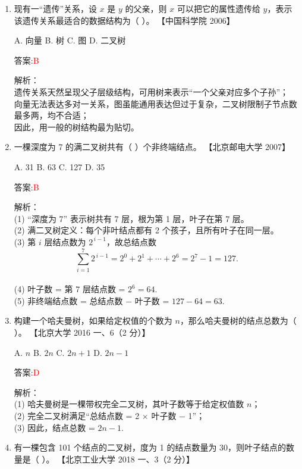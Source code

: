 \documentclass[lang=cn,newtx,10pt,scheme=chinese]{../../../elegantbook}
\begin{document}
\begin{enumerate}
\item 现有一“遗传”关系，设 $x$ 是 $y$ 的父亲，则 $x$ 可以把它的属性遗传给 $y$，表示该遗传关系最适合的数据结构为（ ）。  
    【中国科学院 2006】

    A. 向量  
    B. 树  
    C. 图  
    D. 二叉树  

    答案:\textcolor{red}{B}

    解析：\\
    遗传关系天然呈现父子层级结构，可用树来表示“一个父亲对应多个子孙”；\\
    向量无法表达多对一关系，图虽能通用表达但过于复杂，二叉树限制子节点数最多两，均不合适；\\
    因此，用一般的树结构最为贴切。\\

    \item 一棵深度为 7 的满二叉树共有（ ）个非终端结点。  
    【北京邮电大学 2007】

    A. 31  
    B. 63  
    C. 127  
    D. 35

    答案:\textcolor{red}{B}

    解析：\\
    (1) “深度为 7” 表示树共有 7 层，根为第 1 层，叶子在第 7 层。\\
    (2) 满二叉树定义：每个非叶结点都有 2 个孩子，且所有叶子在同一层。\\
    (3) 第 $i$ 层结点数为 $2^{\,i-1}$，故总结点数  
    \[
      \sum_{i=1}^{7}2^{\,i-1}
      =2^0+2^1+\cdots+2^6
      =2^7-1
      =127.
    \]\\
    (4) 叶子数 = 第 7 层结点数 = $2^{6}=64$.\\
    (5) 非终端结点数 = 总结点数 − 叶子数 = $127-64=63$.\\

\item 构建一个哈夫曼树，如果给定权值的个数为 $n$，那么哈夫曼树的结点总数为（ ）。  
    【北京大学 2016 一、6（2 分）】

    A. $n$  
    B. $2n$  
    C. $2n + 1$  
    D. $2n - 1$

    答案:\textcolor{red}{D}

    解析：\\
    (1) 哈夫曼树是一棵带权完全二叉树，其叶子数等于给定权值数 $n$；\\
    (2) 完全二叉树满足“总结点数 = 2 × 叶子数 − 1”；\\
    (3) 因此，结点总数 = $2n - 1$.\\

\item 有一棵包含 101 个结点的二叉树，度为 1 的结点数量为 30，则叶子结点的数量是（ ）。  
    【北京工业大学 2018 一、3（2 分）】


\end{enumerate}
\end{document}
